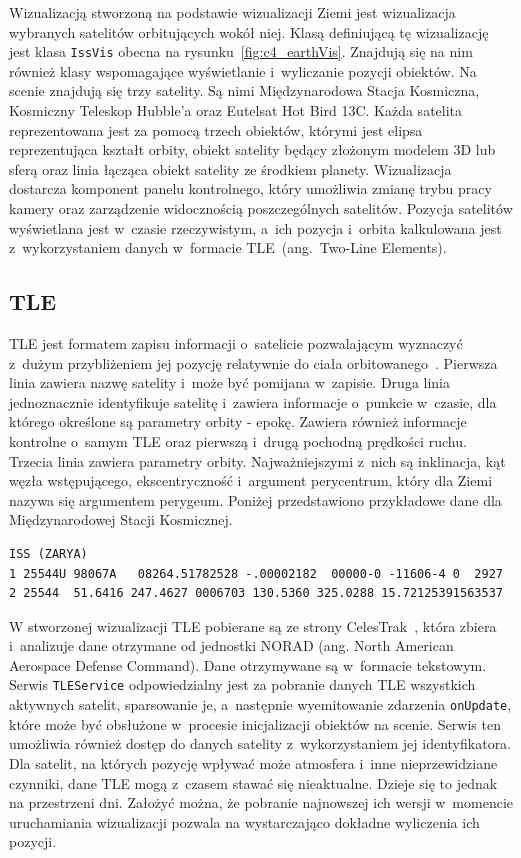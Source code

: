 Wizualizacją stworzoną na podstawie wizualizacji Ziemi jest wizualizacja wybranych satelitów orbitujących wokół niej. Klasą definiującą tę wizualizację jest klasa \texttt{IssVis} obecna na rysunku~\ref{fig:c4_earthVis}. Znajdują się na nim również klasy wspomagające wyświetlanie i~wyliczanie pozycji obiektów. Na scenie znajdują się trzy satelity. Są nimi Międzynarodowa Stacja Kosmiczna, Kosmiczny Teleskop Hubble'a oraz Eutelsat Hot Bird 13C. Każda satelita reprezentowana jest za pomocą trzech obiektów, którymi jest elipsa reprezentująca kształt orbity, obiekt satelity będący złożonym modelem 3D lub sferą oraz linia łącząca obiekt satelity ze środkiem planety.  Wizualizacja dostarcza komponent panelu kontrolnego, który umożliwia zmianę trybu pracy kamery oraz zarządzenie widocznością poszczególnych satelitów. Pozycja satelitów wyświetlana jest w~czasie rzeczywistym, a~ich pozycja i~orbita kalkulowana jest z~wykorzystaniem danych w~formacie TLE~(ang.~Two-Line Elements).

\subsection{TLE}
TLE jest formatem zapisu informacji o~satelicie pozwalającym wyznaczyć z~dużym przybliżeniem jej pozycję relatywnie do ciała orbitowanego~\cite{TLE}. Pierwsza linia zawiera nazwę satelity i~może być pomijana w~zapisie. Druga linia jednoznacznie identyfikuje satelitę i~zawiera informacje o~punkcie w~czasie, dla którego określone są parametry orbity - epokę. Zawiera również informacje kontrolne o~samym TLE oraz pierwszą i~drugą pochodną prędkości ruchu. Trzecia linia zawiera parametry orbity. Najważniejszymi z~nich są inklinacja, kąt węzła wstępującego, ekscentryczność i~argument perycentrum, który dla Ziemi nazywa się argumentem perygeum. Poniżej przedstawiono przykładowe dane dla Międzynarodowej Stacji Kosmicznej.
\begin{verbatim}
ISS (ZARYA)
1 25544U 98067A   08264.51782528 -.00002182  00000-0 -11606-4 0  2927
2 25544  51.6416 247.4627 0006703 130.5360 325.0288 15.72125391563537
\end{verbatim}

W stworzonej wizualizacji TLE pobierane są ze strony CelesTrak~\cite{CelesTrak}, która zbiera i~analizuje dane otrzymane od jednostki NORAD (ang. North American Aerospace Defense Command). Dane otrzymywane są w~formacie tekstowym. Serwis \texttt{TLEService} odpowiedzialny jest za pobranie danych TLE wszystkich aktywnych satelit, sparsowanie je, a~następnie wyemitowanie zdarzenia \texttt{onUpdate}, które może być obsłużone w~procesie inicjalizacji obiektów na scenie. Serwis ten umożliwia również dostęp do danych satelity z~wykorzystaniem jej identyfikatora. Dla satelit, na których pozycję wpływać może atmosfera i~inne nieprzewidziane czynniki, dane TLE mogą z~czasem stawać się nieaktualne. Dzieje się to jednak na przestrzeni dni. Założyć można, że pobranie najnowszej ich wersji w~momencie uruchamiania wizualizacji pozwala na wystarczająco dokładne wyliczenia ich pozycji.

